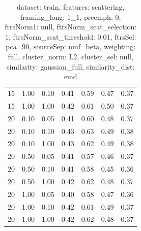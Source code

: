 \begin{table}
\begin{center}
\begin{tabular}{lllcccc}
15 & 1.00 & 0.10 & 0.41 & 0.59 & 0.47 & 0.37 \\ 
15 & 1.00 & 1.00 & 0.42 & 0.61 & 0.50 & 0.37 \\ 
20 & 0.10 & 0.05 & 0.41 & 0.60 & 0.48 & 0.37 \\ 
20 & 0.10 & 0.10 & 0.43 & 0.63 & 0.49 & 0.38 \\ 
20 & 0.10 & 1.00 & 0.43 & 0.62 & 0.49 & 0.38 \\ 
20 & 0.50 & 0.05 & 0.41 & 0.57 & 0.46 & 0.37 \\ 
20 & 0.50 & 0.10 & 0.41 & 0.58 & 0.45 & 0.36 \\ 
20 & 0.50 & 1.00 & 0.42 & 0.62 & 0.48 & 0.37 \\ 
20 & 1.00 & 0.05 & 0.40 & 0.58 & 0.47 & 0.36 \\ 
20 & 1.00 & 0.10 & 0.42 & 0.61 & 0.49 & 0.37 \\ 
20 & 1.00 & 1.00 & 0.42 & 0.62 & 0.48 & 0.37 \\ 
\end{tabular} 
\end{center} 
\caption{dataset: train, features: scattering, framing\_long: 1\_1, preemph: 0, ftrsNorm1: null, ftrsNorm\_scat\_selection: 1, ftrsNorm\_scat\_threshold: 0.01, ftrsSel: pca\_90, sourceSep: nmf\_beta, weighting: full, cluster\_norm: L2, cluster\_sel: null, similarity: gaussian\_full, similarity\_dist: emd} 
\label{datasetrFeaturscFraminlong1_1Preemp0Ftrsnorm1nuFtrsnoscatselect1Ftrsnoscatthresh0.01Ftrsselpc90SourcesepnmbeWeightfuClustenormL2ClusteselnuSimilagafuSimiladistem} 
\end{table} 
 
